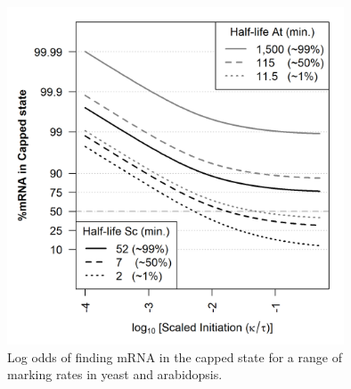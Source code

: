 \documentclass[review]{elsarticle}
\begin{document}
\begin{figure}[!ht]
\centering
\includegraphics[width=100mm]{Images/2023-07-13_logodds.png}
\caption{Log odds of finding mRNA in the capped state for a range of marking rates in yeast and arabidopsis. }
\end{figure}
\end{document}
